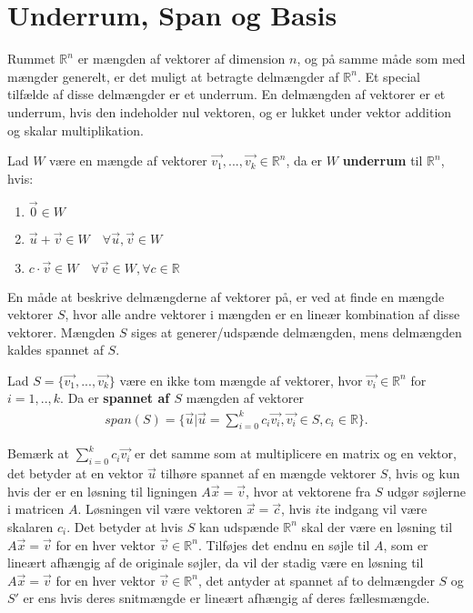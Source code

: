 \section{Underrum, Span og Basis}
Rummet $\mathds{R}^n$ er mængden af vektorer af dimension $n$, og på samme måde som med mængder generelt, er det muligt at betragte delmængder af $\mathds{R}^n$.
Et special tilfælde af disse delmængder er et underrum.
En delmængden af vektorer  er et underrum, hvis den indeholder nul vektoren, og er lukket under vektor addition og skalar multiplikation. 
\begin{defn}[Underrum]
Lad $W$ være en mængde af vektorer $\vec{v_1},...,\vec{v_k} \in \mathds{R}^n$, da er $W$  \textbf{underrum} til $\mathds{R}^n$, hvis:
\begin{enumerate}[label=\alph*]
\item $\vec{0} \in W$
\item $\vec{u}+\vec{v} \in W \quad \forall \vec{u}, \vec{v} \in W$
\item $c \cdot \vec{v} \in W \quad \forall \vec{v} \in W, \forall c \in \mathds{R}$
\end{enumerate}
\label{def:underrum}
\end{defn}
En måde at beskrive delmængderne af vektorer på, er ved at finde en mængde vektorer $S$, hvor alle andre vektorer i mængden er en lineær kombination af disse vektorer. 
Mængden $S$ siges at generer/udspænde delmængden, mens delmængden kaldes spannet af $S$.
\begin{defn}[Span]
Lad $S=\{\vec{v_1},...,\vec{v_k}\}$ være en ikke tom mængde af vektorer, hvor $\vec{v_i} \in \mathds{R}^n$ for $i = 1,..,k$. 
Da er \textbf{spannet af $S$} mængden af vektorer
\begin{align*}
span(S) = \{\vec{u}| \vec{u}=\sum_{i=0}^k c_i \vec{v_i}, \vec{v_i} \in S, c_i \in \mathds{R}\}.
\end{align*} 
\label{def:span}
\end{defn}
Bemærk at $\sum_{i=0}^k c_i \vec{v_i}$ er det samme som at multiplicere en matrix og en vektor, det betyder at en vektor $\vec{u}$ tilhøre spannet af en mængde vektorer $S$, hvis og kun hvis der er en løsning til ligningen $A\vec{x} = \vec{v}$, hvor at vektorene fra $S$ udgør søjlerne i matricen $A$.
Løsningen vil være vektoren $\vec{x}=\vec{c}$, hvis $i$te indgang vil være skalaren $c_i$.
Det betyder at hvis $S$ kan udspænde $\mathds{R}^n$ skal der være en løsning til $A \vec{x} = \vec{v}$ for en hver vektor $\vec{v} \in \mathds{R}^n$. 
Tilføjes det endnu en søjle til $A$, som er lineært afhængig af de originale søjler, da vil der stadig være en løsning til $A \vec{x} = \vec{v}$ for en hver vektor $\vec{v} \in \mathds{R}^n$, det antyder at spannet af to delmængder $S$ og $S'$ er ens hvis deres snitmængde er lineært afhængig af deres fællesmængde.
